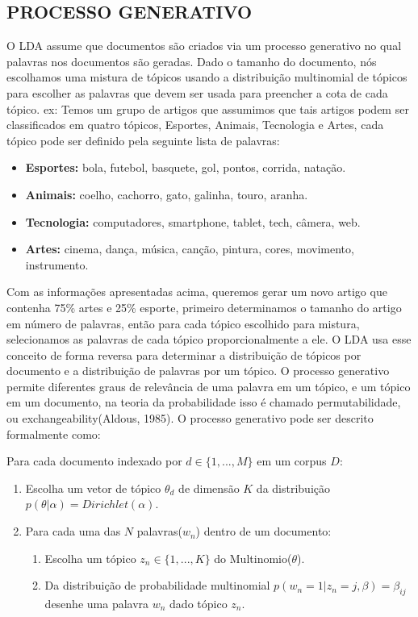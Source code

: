 \documentclass[12pt,a4paper]{article}
\begin{document}
  \subsection{PROCESSO GENERATIVO}
  O LDA assume que documentos são criados via um processo generativo no qual palavras nos documentos são geradas. Dado o tamanho do documento, nós escolhamos uma mistura de tópicos usando a distribuição multinomial de tópicos para escolher as palavras que devem ser usada para preencher a cota de cada tópico. ex: Temos um grupo de artigos que assumimos que tais artigos podem ser classificados em quatro tópicos, Esportes, Animais, Tecnologia e Artes, cada tópico pode ser definido pela seguinte lista de palavras:
  
  \begin{itemize}
    \item \textbf{ Esportes:} bola, futebol, basquete, gol, pontos, corrida, natação.
    \item \textbf{ Animais:} coelho, cachorro, gato, galinha, touro, aranha.
    \item \textbf{ Tecnologia:} computadores, smartphone, tablet, tech, câmera, web.
    \item \textbf{ Artes:} cinema, dança, música, canção, pintura, cores, movimento, instrumento.
  \end{itemize}
  
  Com as informações apresentadas acima, queremos gerar um novo artigo que contenha 75\% artes e 25\% esporte, primeiro determinamos o tamanho do artigo em número de palavras, então para cada tópico escolhido para mistura, selecionamos as palavras de cada tópico proporcionalmente a ele. O LDA usa esse conceito de forma reversa para determinar a distribuição de tópicos por documento e a distribuição de palavras por um tópico. O processo generativo permite diferentes graus de relevância de uma palavra em um tópico, e um tópico em um documento, na teoria da probabilidade isso é chamado permutabilidade, ou exchangeability(Aldous, 1985). O processo generativo pode ser descrito formalmente como:
  
  Para cada documento indexado por $d \in \{1,. . . , M\}$ em um corpus $D$:
  
  \begin{enumerate}
    \item Escolha um vetor de tópico $\theta _d$ de dimensão $K$ da distribuição $p(\theta|\alpha)=Dirichlet(\alpha)$.
    \item Para cada uma das $N$ palavras($w_n$) dentro de um documento:
    \begin{enumerate}
      \item Escolha um tópico \(z_n \in \{1,. . . , K\}\) do Multinomio($\theta$).
      \item Da distribuição de probabilidade multinomial \(p(w_n=1| z_n=j,\beta)=\beta _{ij}\)  desenhe uma palavra $w_n$ dado tópico $z_n$.
    \end{enumerate}
  \end{enumerate}
  
\end{document}
